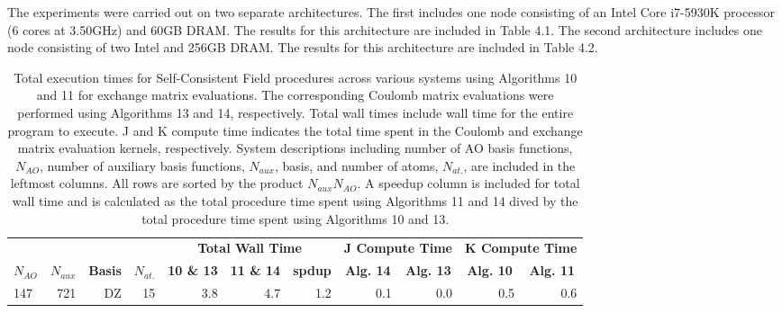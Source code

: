 The experiments were carried out on two separate architectures. The first includes one node consisting of an Intel Core i7-5930K processor
(6 cores at 3.50GHz) and 60GB DRAM. The results for this architecture are included in Table 4.1. The second architecture includes one node consisting
of two Intel and 256GB DRAM. The results for this architecture are included in Table 4.2. 

\begingroup
\renewcommand{\arraystretch}{0.7}
\begin{table}[H]
\footnotesize
\centering
\renewcommand{\baselinestretch}{1}
\caption{Total execution times for Self-Consistent Field procedures across various systems using Algorithms 10 and 11 for exchange matrix evaluations. 
The corresponding Coulomb matrix evaluations were performed using Algorithms 13 and 14, respectively. Total wall times include 
wall time for the entire program to execute. J and K compute time indicates the total time spent in the Coulomb and exchange matrix
evaluation kernels, respectively. System descriptions including number of AO basis functions, $N_{AO}$, number of auxiliary basis functions,
$N_{aux}$, basis, and number of atoms, $N_{at.}$, are included in the leftmost columns. All rows are sorted by the product $N_{aux}N_{AO}$.
A speedup column is included for total wall time and is calculated as the total procedure time spent using Algorithms 11 and 14 dived by 
the total procedure time spent using Algorithms 10 and 13.
\label{tbl:practical_speedups}}
\begin{tabular}{lrrrrrrrrrr}
  \multicolumn{1}{c}{\textbf{}} 
& \multicolumn{1}{c}{\textbf{}} 
& \multicolumn{1}{c}{\textbf{}} 
& \multicolumn{1}{c}{\textbf{}} 
& \multicolumn{3}{c}{\textbf{Total Wall Time}}  
& \multicolumn{2}{c}{\textbf{J Compute Time}}  
& \multicolumn{2}{c}{\textbf{K Compute Time}} \\ 
\cline{5-7}
\cline{8-9}
\cline{10-11}
  \multicolumn{1}{c}{\textbf{$N_{AO}$}} 
& \multicolumn{1}{c}{\textbf{$N_{aux}$}} 
& \multicolumn{1}{c}{\textbf{Basis}} 
& \multicolumn{1}{c}{\textbf{$N_{at.}$}} 
& \multicolumn{1}{c}{\textbf{10 \& 13}} 
& \multicolumn{1}{c}{\textbf{11 \& 14}} 
& \multicolumn{1}{c}{\textbf{spdup}} 
& \multicolumn{1}{c}{\textbf{Alg. 14}} 
& \multicolumn{1}{c}{\textbf{Alg. 13}} 
& \multicolumn{1}{c}{\textbf{Alg. 10}} 
& \multicolumn{1}{c}{\textbf{Alg. 11}} \\ 
\hline
 147&  721&    DZ&    15&                 3.8 &                4.7&     1.2 &                0.1 &                0.0&                 0.5&                 0.6\\

\end{tabular}
\end{table}
